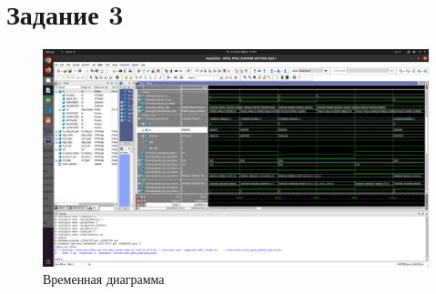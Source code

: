 \section{Задание 3}

\begin{figure}[ht!]
    \centering
    \includegraphics[width=170mm]{./img/task_3.png}
    \caption{Временная диаграмма \label{overflow1}}
\end{figure}